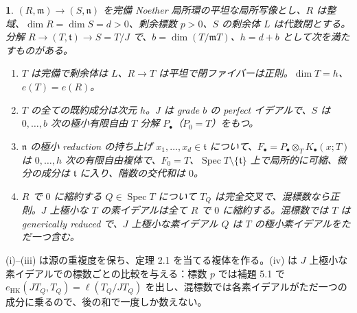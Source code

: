 \documentclass[11pt,a4paper]{ltjsarticle}
\newcommand{\stmtname}{}
\theoremstyle{plain}
\newtheorem*{stmtgen}{\stmtname}
\newenvironment{stmt}[1]{\renewcommand{\stmtname}{#1}\begin{stmtgen}}{\end{stmtgen}}
\theoremstyle{definition}
\newcommand{\m}{\mathfrak{m}}
\newcommand{\n}{\mathfrak{n}}
\newcommand{\tf}{\mathfrak{t}}
\newcommand{\Spec}{\operatorname{Spec}}
\newcommand{\eHK}{e_{\mathrm{HK}}}
\begin{document}
\begin{stmt}{命題 4.3}
$(R,\m)\to(S,\n)$ を完備 Noether 局所環の平坦な局所写像とし、$R$ は整域、$\dim R = \dim S = d>0$、剰余標数 $p>0$、$S$ の剰余体 $L$ は代数閉とする。分解
$R\to(T,\tf)\to S = T/J$
で、$b = \dim(T/\m T)$、$h = d+b$ として次を満たすものがある。
\begin{enumerate}[label=(\roman*)]
  \item $T$ は完備で剰余体は $L$、$R\to T$ は平坦で閉ファイバーは正則。$\dim T = h$、$e(T) = e(R)$。
  \item $T$ の全ての既約成分は次元 $h$。$J$ は grade $b$ の perfect イデアルで、$S$ は $0,\dots,b$ 次の極小有限自由 $T$ 分解 $P_\bullet$（$P_0 = T$）をもつ。
  \item $\n$ の極小 reduction の持ち上げ $x_1,\dots,x_d\in\tf$ について、$F_\bullet = P_\bullet\otimes_TK_\bullet(x;T)$ は $0,\dots,h$ 次の有限自由複体で、$F_0 = T$、$\Spec T\setminus\{\tf\}$ 上で局所的に可縮、微分の成分は $\tf$ に入り、階数の交代和は $0$。
  \item $R$ で $0$ に縮約する $Q\in\Spec T$ について $T_Q$ は完全交叉で、混標数なら正則。$J$ 上極小な $T$ の素イデアルは全て $R$ で $0$ に縮約する。混標数では $T$ は generically reduced で、$J$ 上極小な素イデアル $Q$ は $T$ の極小素イデアルをただ一つ含む。
\end{enumerate}
\end{stmt}
(i)--(iii) は源の重複度を保ち、定理 2.1 を当てる複体を作る。(iv) は $J$ 上極小な素イデアルでの標数ごとの比較を与える：標数 $p$ では補題 5.1 で $\eHK(JT_Q,T_Q) = \ell(T_Q/JT_Q)$ を出し、混標数では各素イデアルがただ一つの成分に乗るので、後の和で一度しか数えない。
\end{document}
